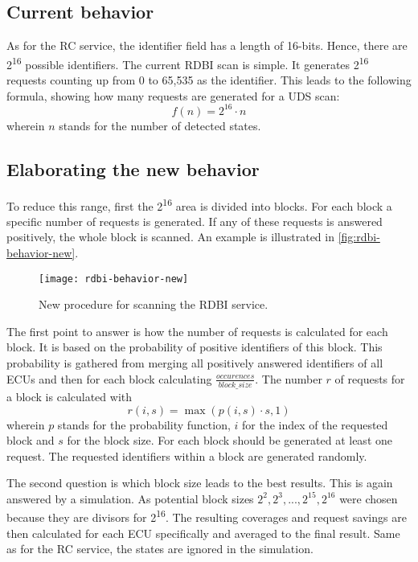 \subsection{Current behavior}

As for the RC service, the identifier field has a length of 16-bits. Hence, there are 2\textsuperscript{16} possible identifiers.
The current RDBI scan is simple. It generates 2\textsuperscript{16} requests counting up from 0 to 65,535 as the identifier. This leads to the following formula, showing how many requests are generated for a UDS scan:
\[f(n)=2^{16} \cdot n\]
wherein $n$ stands for the number of detected states. 

\subsection{Elaborating the new behavior}
\label{subsubsec:rdbi-behavior}

To reduce this range, first the 2\textsuperscript{16} area is divided into blocks. For each block a specific number of requests is generated. If any of these requests is answered positively, the whole block is scanned.  An example is illustrated in \autoref{fig:rdbi-behavior-new}.

\begin{figure}[h]
    \centering
    \texttt{[image: rdbi-behavior-new]}
    \caption{New procedure for scanning the RDBI service.}
    \label{fig:rdbi-behavior-new}
\end{figure}

The first point to answer is how the number of requests is calculated for each block. It is based on the probability of positive identifiers of this block. This probability is gathered from merging all positively answered identifiers of all ECUs and then for each block calculating $\frac{occurences}{block\_size}$. The number $r$ of requests for a block is calculated with
\[r(i, s)=\max(p(i, s) \cdot s, 1)\]
wherein $p$ stands for the probability function, $i$ for the index of the requested block and $s$ for the block size. For each block should be generated at least one request. The requested identifiers within a block are generated randomly.

The second question is which block size leads to the best results. This is again answered by a simulation. As potential block sizes $2^2, 2^3, ..., 2^{15}, 2^{16}$ were chosen because they are divisors for 2\textsuperscript{16}. The resulting coverages and request savings are then calculated for each ECU specifically and averaged to the final result. Same as for the RC service, the states are ignored in the simulation.

